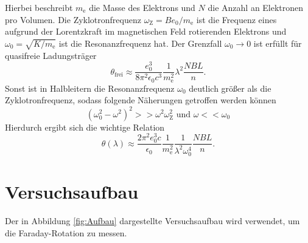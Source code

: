 \documentclass[
  bibliography=totoc,     %
  captions=tableheading,  %
  titlepage=firstiscover, %
]{scrartcl}
\begin{document}
Hierbei beschreibt $m_\text{e}$ die Masse des Elektrons und $N$
die Anzahl an Elektronen pro Volumen.
Die Zyklotronfrequenz $\omega_\text{Z} = B e_0 / m_\text{e}$ ist die Frequenz eines aufgrund
der Lorentzkraft im magnetischen Feld rotierenden Elektrons und $\omega_0 = \sqrt{K / m_\text{e}}$
ist die Resonanzfrequenz hat.
Der Grenzfall $\omega_0 \rightarrow 0$ ist erfüllt für quasifreie Ladungsträger
\begin{equation}
  \theta_\text{frei} \approx \frac{e_0^3}{8 \pi^2 \epsilon_0 c^3}
  \frac{1}{m_\text{e}^2} \lambda^2 \frac{N B L}{n}.
  \label{eqn:theta-frei}
\end{equation}
Sonst ist in Halbleitern die Resonanzfrequenz $\omega_0$
deutlich größer als die Zyklotronfrequenz, sodass folgende Näherungen getroffen werden können
\begin{equation*}
  \left(\omega_0^2 - \omega^2\right)^2 >> \omega^2 \omega_\text{Z}^2
  \text{    und    }
  \omega << \omega_0
\end{equation*}
Hierdurch ergibt sich die wichtige Relation
\begin{equation}
  \theta\left(\lambda\right) \approx \frac{2 \pi^2 e_0^3 c}{\epsilon_0}
  \frac{1}{m_\text{e}^2}\frac{1}{\lambda^2 \omega_0^4}
  \frac{N B L}{n}.
  \label{eqn:theta-gebunden}
\end{equation}

\newpage
\section{Versuchsaufbau}
\label{sec:Aufbau}

Der in Abbildung \ref{fig:Aufbau} dargestellte Versuchsaufbau wird verwendet, um
die Faraday-Rotation zu messen.
\end{document}
